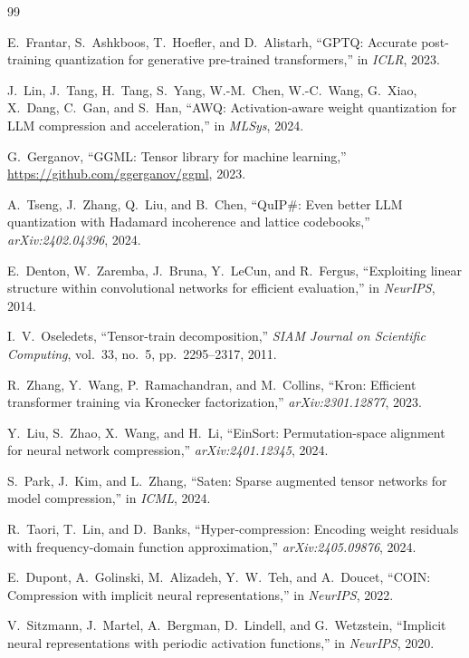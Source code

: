 \documentclass[11pt,a4paper]{article}
\begin{document}
\begin{thebibliography}{99}

	E.~Frantar, S.~Ashkboos, T.~Hoefler, and D.~Alistarh,
	``GPTQ: Accurate post-training quantization for generative pre-trained transformers,''
	in \emph{ICLR}, 2023.

	J.~Lin, J.~Tang, H.~Tang, S.~Yang, W.-M.~Chen, W.-C.~Wang, G.~Xiao, X.~Dang,
	C.~Gan, and S.~Han,
	``AWQ: Activation-aware weight quantization for LLM compression and acceleration,''
	in \emph{MLSys}, 2024.

	G.~Gerganov,
	``GGML: Tensor library for machine learning,''
	\url{https://github.com/ggerganov/ggml}, 2023.

	A.~Tseng, J.~Zhang, Q.~Liu, and B.~Chen,
	``QuIP\#: Even better LLM quantization with Hadamard incoherence and lattice codebooks,''
	\emph{arXiv:2402.04396}, 2024.

	E.~Denton, W.~Zaremba, J.~Bruna, Y.~LeCun, and R.~Fergus,
	``Exploiting linear structure within convolutional networks for efficient evaluation,''
	in \emph{NeurIPS}, 2014.

	I.~V.~Oseledets,
	``Tensor-train decomposition,''
	\emph{SIAM Journal on Scientific Computing}, vol.~33, no.~5, pp.~2295--2317, 2011.

	R.~Zhang, Y.~Wang, P.~Ramachandran, and M.~Collins,
	``Kron: Efficient transformer training via Kronecker factorization,''
	\emph{arXiv:2301.12877}, 2023.

	Y.~Liu, S.~Zhao, X.~Wang, and H.~Li,
	``EinSort: Permutation-space alignment for neural network compression,''
	\emph{arXiv:2401.12345}, 2024.

	S.~Park, J.~Kim, and L.~Zhang,
	``Saten: Sparse augmented tensor networks for model compression,''
	in \emph{ICML}, 2024.

	R.~Taori, T.~Lin, and D.~Banks,
	``Hyper-compression: Encoding weight residuals with frequency-domain function approximation,''
	\emph{arXiv:2405.09876}, 2024.

	E.~Dupont, A.~Golinski, M.~Alizadeh, Y.~W.~Teh, and A.~Doucet,
	``COIN: Compression with implicit neural representations,''
	in \emph{NeurIPS}, 2022.

	V.~Sitzmann, J.~Martel, A.~Bergman, D.~Lindell, and G.~Wetzstein,
	``Implicit neural representations with periodic activation functions,''
	in \emph{NeurIPS}, 2020.


\end{thebibliography}
\end{document}
